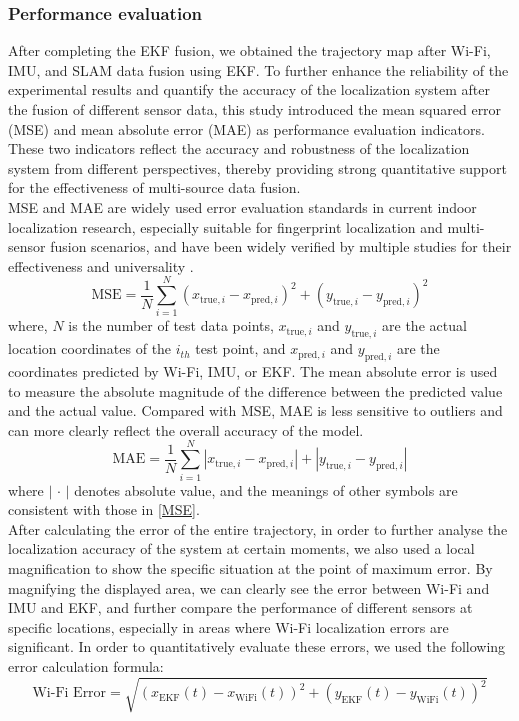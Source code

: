 \documentclass[12pt,a4paper]{article}
\numberwithin{equation}{section}
\begin{document}
\subsubsection{Performance evaluation}
After completing the EKF fusion, we obtained the trajectory map after Wi-Fi, IMU, and SLAM data fusion using EKF. To further enhance the reliability of the experimental results and quantify the accuracy of the localization system after the fusion of different sensor data, this study introduced the mean squared error (MSE) and mean absolute error (MAE) as performance evaluation indicators. These two indicators reflect the accuracy and robustness of the localization system from different perspectives, thereby providing strong quantitative support for the effectiveness of multi-source data fusion.\\
MSE and MAE are widely used error evaluation standards in current indoor localization research, especially suitable for fingerprint localization and multi-sensor fusion scenarios, and have been widely verified by multiple studies for their effectiveness and universality \cite{sun2019fusion, he2015wi}.
\begin{equation}
\text{MSE} = \frac{1}{N} \sum_{i=1}^{N} \left( x_{\text{true}, i} - x_{\text{pred}, i} \right)^2 + \left( y_{\text{true}, i} - y_{\text{pred}, i} \right)^2
\label{MSE}
\end{equation}
where, $N$ is the number of test data points, $x_{\text{true}, i}$ and $y_{\text{true}, i}$ are the actual location coordinates of the $i_{th}$ test point, and $x_{\text{pred}, i}$ and $y_{\text{pred}, i}$ are the coordinates predicted by Wi-Fi, IMU, or EKF.
The mean absolute error is used to measure the absolute magnitude of the difference between the predicted value and the actual value. Compared with MSE, MAE is less sensitive to outliers and can more clearly reflect the overall accuracy of the model.
\begin{equation}
\text{MAE} = \frac{1}{N} \sum_{i=1}^{N} \left| x_{\text{true}, i} - x_{\text{pred}, i} \right| + \left| y_{\text{true}, i} - y_{\text{pred}, i} \right|
\label{MAE}
\end{equation}
where $\left| \,\cdot\, \right|$ denotes absolute value, and the meanings of other symbols are consistent with those in \autoref{MSE}.\\
After calculating the error of the entire trajectory, in order to further analyse the localization accuracy of the system at certain moments, we also used a local magnification to show the specific situation at the point of maximum error. By magnifying the displayed area, we can clearly see the error between Wi-Fi and IMU and EKF, and further compare the performance of different sensors at specific locations, especially in areas where Wi-Fi localization errors are significant. In order to quantitatively evaluate these errors, we used the following error calculation formula:
\begin{equation}
\text{Wi-Fi Error} = \sqrt{(x_{\text{EKF}}(t) - x_{\text{WiFi}}(t))^2 + (y_{\text{EKF}}(t) - y_{\text{WiFi}}(t))^2}
\end{equation}
\end{document}
